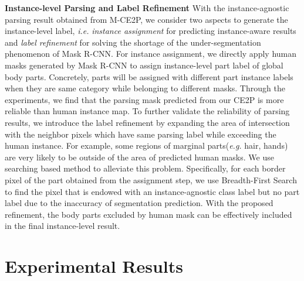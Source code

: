\documentclass[letterpaper]{article} \usepackage{formatting-instructions-latex-2019}  \usepackage{times}  \usepackage{helvet}  \usepackage{courier}  \usepackage{url}  \usepackage{graphicx}  \frenchspacing  \setlength{\pdfpagewidth}{8.5in}  \setlength{\pdfpageheight}{11in}
\newcommand{\eg}{\emph{e.g. }}
\newcommand{\ie}{\emph{i.e. }}
\begin{document}
\noindent \textbf{Instance-level Parsing and Label Refinement}
With the instance-agnostic parsing result obtained from M-CE2P, we consider two aspects to generate the instance-level label, \ie \emph{instance assignment} for predicting instance-aware results and \emph{label refinement} for solving the shortage of the under-segmentation phenomenon of Mask R-CNN. For instance assignment, we directly apply human masks generated by Mask R-CNN to assign instance-level part label of global body parts. Concretely, parts will be assigned with different part instance labels when they are same category while belonging to different masks. Through the experiments, we find that the parsing mask predicted from our CE2P is more reliable than human instance map. To further validate the reliability of parsing results, we introduce the label refinement by expanding the area of intersection with the neighbor pixels which have same parsing label while exceeding the human instance. For example, some regions of marginal parts(\eg hair, hands) are very likely to be outside of the area of predicted human masks. We use searching based method to alleviate this problem. Specifically, for each border pixel of the part obtained from the assignment step, we use Breadth-First Search to find the pixel that is endowed with an instance-agnostic class label but no part label due to the inaccuracy of segmentation prediction. With the proposed refinement, the body parts excluded by human mask can be effectively included in the final instance-level result.  













\section{Experimental Results}
\end{document}
